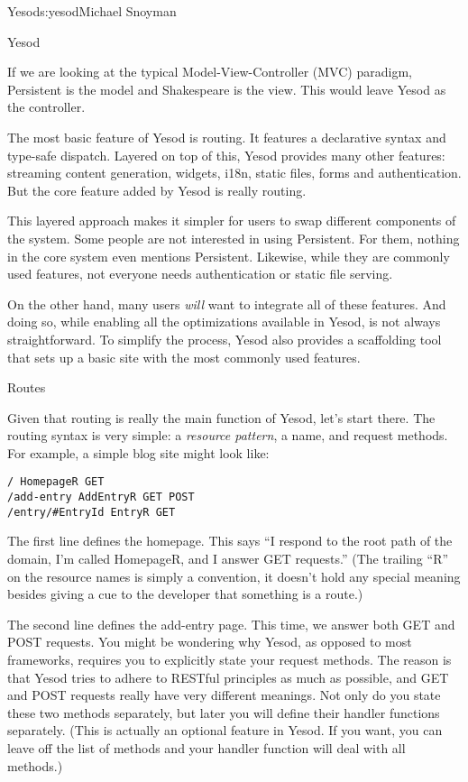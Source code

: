 \begin{aosachapter}{Yesod}{s:yesod}{Michael Snoyman}
\begin{aosasect1}{Yesod}

If we are looking at the typical Model-View-Controller (MVC)
paradigm, Persistent is the model and Shakespeare is the view. This
would leave Yesod as the controller.


The most basic feature of Yesod is routing. It features a declarative
syntax and type-safe dispatch. Layered on top of this, Yesod provides
many other features: streaming content generation, widgets, i18n,
static files, forms and authentication. But the core feature added by
Yesod is really routing.

This layered approach makes it simpler for users to swap different
components of the system. Some people are not interested in using
Persistent. For them, nothing in the core system even mentions
Persistent. Likewise, while they are commonly used features, not everyone needs
authentication or static file serving.

On the other hand, many users \emph{will} want to integrate all of
these features. And doing so, while enabling all the optimizations
available in Yesod, is not always straightforward. To simplify the
process, Yesod also provides a scaffolding tool that sets up a
basic site with the most commonly used features.

\begin{aosasect2}{Routes}

Given that routing is really the main function of Yesod, let's start
there. The routing syntax is very simple: a \emph{resource pattern}, a
name, and request methods. For example, a simple blog site might look
like:

\begin{verbatim}
/ HomepageR GET
/add-entry AddEntryR GET POST
/entry/#EntryId EntryR GET
\end{verbatim}

The first line defines the homepage. This says ``I respond to the root
path of the domain, I'm called HomepageR, and I answer GET requests.''
(The trailing ``R'' on the resource names is simply a convention, it
doesn't hold any special meaning besides giving a cue to the developer
that something is a route.)

The second line defines the add-entry page. This time, we answer both
GET and POST requests. You might be wondering why Yesod, as opposed to
most frameworks, requires you to explicitly state your request
methods. The reason is that Yesod tries to adhere to RESTful
principles as much as possible, and GET and POST requests really have
very different meanings. Not only do you state these two methods
separately, but later you will define their handler functions
separately. (This is actually an optional feature in Yesod. If you
want, you can leave off the list of methods and your handler function
will deal with all methods.)


\end{aosasect2}
\end{aosasect1}
\end{aosachapter}
